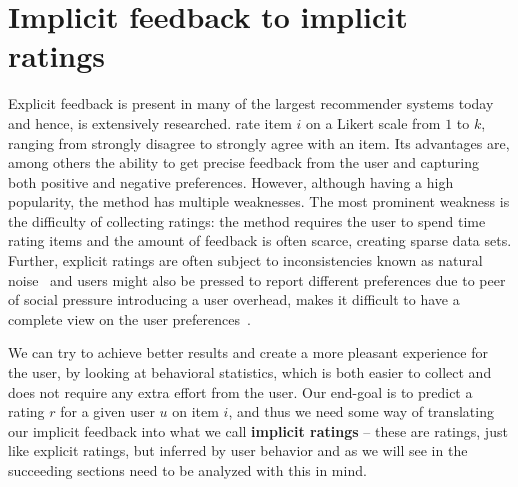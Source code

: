 




\label{implicit-feedback}
\section{Implicit feedback to implicit ratings}
\label{sec:implicit}


Explicit feedback is present in many of the largest recommender systems today
and hence, is extensively researched.%
rate item $i$ on a Likert scale from $1$ to $k$, ranging from strongly
disagree to strongly agree with an item. Its advantages are, among others the
ability to get precise feedback from the user and capturing both positive and
negative preferences. However, although having a high popularity, the method
has multiple weaknesses. The most prominent weakness is the difficulty of
collecting ratings: the method requires the user to spend time rating items and
the amount of feedback is often scarce, creating sparse data sets. Further,
explicit ratings are often subject to inconsistencies known as natural
noise~\cite{amatriain2009like} and users might also be pressed to report
different preferences due to peer of social pressure %
introducing a user overhead, makes it difficult to have a complete view on the
user preferences~\cite{Jawaheer2010}.

We can try to achieve better results and create a more pleasant experience for
the user, by looking at behavioral statistics, which is both easier to collect
and does not require any extra effort from the user. Our end-goal is to predict
a rating $r$ for a given user $u$ on item $i$, and thus we need some way of
translating our implicit feedback into what we call \textbf{implicit ratings} –
these are ratings, just like explicit ratings, but inferred by user behavior
and as we will see in the succeeding sections need to be analyzed with this in
mind.

